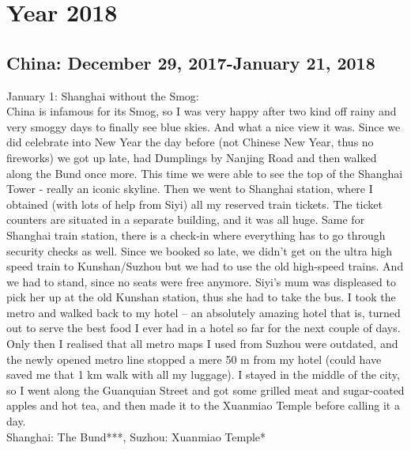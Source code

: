  \chapter{Year 2018}
\label{2018}

\section{China: December 29, 2017-January 21, 2018}
\label{2018:China}

January 1: Shanghai without the Smog:\\
China is infamous for its Smog, so I was very happy after two kind off rainy and very smoggy days to finally see blue skies. And what a nice view it was. Since we did celebrate into New Year the day before (not Chinese New Year, thus no fireworks) we got up late, had Dumplings by Nanjing Road and then walked along the Bund once more. This time we were able to see the top of the Shanghai Tower - really an iconic skyline. Then we went to Shanghai station, where I obtained (with lots of help from Siyi) all my reserved train tickets. The ticket counters are situated in a separate building, and it was all huge. Same for Shanghai train station, there is a check-in where everything has to go through security checks as well. Since we booked so late, we didn't get on the ultra high speed train to Kunshan/Suzhou but we had to use the old high-speed trains. And we had to stand, since no seats were free anymore. Siyi's mum was displeased to pick her up at the old Kunshan station, thus she had to take the bus. I took the metro and walked back to my hotel -- an absolutely amazing hotel that is, turned out to serve the best food I ever had in a hotel so far for the next couple of days. Only then I realised that all metro maps I used from Suzhou were outdated, and the newly opened metro line stopped a mere 50 m from my hotel (could have saved me that 1 km walk with all my luggage). I stayed in the middle of the city, so I went along the Guanquian Street and got some grilled meat and sugar-coated apples and hot tea, and then made it to the Xuanmiao Temple before calling it a day.\\

Shanghai: The Bund***, Suzhou: Xuanmiao Temple*\\

